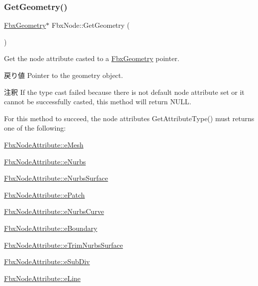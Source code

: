 \subsubsection{\texorpdfstring{Get\+Geometry()}{GetGeometry()}}
{\footnotesize\ttfamily \hyperlink{class_fbx_geometry}{Fbx\+Geometry}$\ast$ Fbx\+Node\+::\+Get\+Geometry (\begin{DoxyParamCaption}{ }\end{DoxyParamCaption})}

Get the node attribute casted to a \hyperlink{class_fbx_geometry}{Fbx\+Geometry} pointer. \begin{DoxyReturn}{戻り値}
Pointer to the geometry object. 
\end{DoxyReturn}
\begin{DoxyRemark}{注釈}
If the type cast failed because there is not default node attribute set or it cannot be successfully casted, this method will return {\ttfamily N\+U\+LL}. 

For this method to succeed, the node attribute\textquotesingle{}s Get\+Attribute\+Type() must returns one of the following\+:
\begin{DoxyItemize}
\item \hyperlink{class_fbx_node_attribute_a08e1669d3d1a696910756ab17de56d6aa1f3752eb765c9e29065decc930b75fb8}{Fbx\+Node\+Attribute\+::e\+Mesh}
\item \hyperlink{class_fbx_node_attribute_a08e1669d3d1a696910756ab17de56d6aa34e416198478e89143c5d2eaf909cecc}{Fbx\+Node\+Attribute\+::e\+Nurbs}
\item \hyperlink{class_fbx_node_attribute_a08e1669d3d1a696910756ab17de56d6aa68f3a29a257dd9a8c734ae5118cbbec3}{Fbx\+Node\+Attribute\+::e\+Nurbs\+Surface}
\item \hyperlink{class_fbx_node_attribute_a08e1669d3d1a696910756ab17de56d6aa22755745b03034d2d98691279f4b2adf}{Fbx\+Node\+Attribute\+::e\+Patch}
\item \hyperlink{class_fbx_node_attribute_a08e1669d3d1a696910756ab17de56d6aae7a889cc6d7682817fc718d13048187f}{Fbx\+Node\+Attribute\+::e\+Nurbs\+Curve}
\item \hyperlink{class_fbx_node_attribute_a08e1669d3d1a696910756ab17de56d6aaeb57196752c14c4d1162b0c012348bb0}{Fbx\+Node\+Attribute\+::e\+Boundary}
\item \hyperlink{class_fbx_node_attribute_a08e1669d3d1a696910756ab17de56d6aae2ea2fbaa7dc68c851ba5cd32cada6e7}{Fbx\+Node\+Attribute\+::e\+Trim\+Nurbs\+Surface}
\item \hyperlink{class_fbx_node_attribute_a08e1669d3d1a696910756ab17de56d6aabf6eece53604664abed75e7fb2720832}{Fbx\+Node\+Attribute\+::e\+Sub\+Div}
\item \hyperlink{class_fbx_node_attribute_a08e1669d3d1a696910756ab17de56d6aaa0d151ae35b73ebdaecb489b8c1cb575}{Fbx\+Node\+Attribute\+::e\+Line} 
\end{DoxyItemize}
\end{DoxyRemark}
\mbox{\label{class_fbx_node_ae0a001060ab0ae9dc7ce0e9be6781e96}} 

